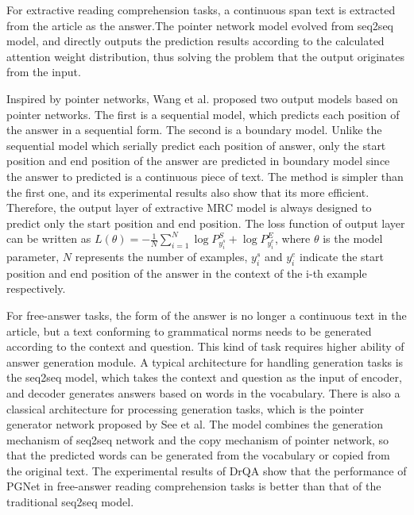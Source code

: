 For extractive reading comprehension tasks, a continuous span text is extracted from the article as the answer.The pointer network model evolved from seq2seq model, and directly outputs 
the prediction results according to the calculated attention weight distribution, thus solving the problem that the output originates from the input.

Inspired by pointer networks, Wang et al. proposed two output models based on pointer networks. The first is a sequential model, which predicts each position of the answer in a sequential 
form. The second is a boundary model. Unlike the sequential model which serially predict each position of answer, only the start position and end position of the answer are predicted in boundary model since the answer to predicted is a continuous piece of text. 
The method is simpler than the first one, and its experimental results also show that its more efficient. Therefore, the output layer of extractive MRC model is always designed to predict only the start position and end 
position. The loss function of output layer can be written as $L(\theta)=-\displaystyle\frac{1}{N}\sum_{i=1}^{N}\log P_{y_i^s}^{S}+\log P_{y_i^e}^E$, where $\theta$ is the model parameter, 
$N$ represents the number of examples, $y_i^s$ and $y_i^e$ indicate the start position and end position of the answer in the context of the i-th example respectively.

For free-answer tasks, the form of the answer is no longer a continuous text in the article, but a text conforming to grammatical norms needs to be generated according to the context and question. This kind of task requires 
higher ability of answer generation module. A typical architecture for handling generation tasks is the seq2seq model, which takes the context and question as the input of encoder, and decoder generates answers based on words in the vocabulary. 
There is also a classical architecture for processing generation tasks, which is the pointer generator network proposed by See et al. 
The model combines the generation mechanism of seq2seq network and the copy mechanism of pointer network, so that the predicted words can be generated from the vocabulary or copied from the original text.
The experimental results of DrQA show that the performance of PGNet in free-answer reading comprehension tasks is better than that of the traditional seq2seq model.

